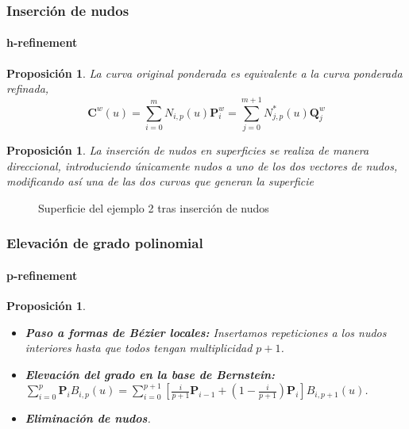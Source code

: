 \documentclass[compress]{beamer}
\newtheorem{proposition}[theorem]{Proposición}
\begin{document}
\begin{frame}
	\frametitle{Inserción de nudos}
	\framesubtitle{h-refinement}

	\scriptsize
	\begin{proposition}
		La curva original ponderada es equivalente a la curva ponderada refinada,
		\vspace{-0.35cm}
		\begin{equation*}
			\mathbf{C}^{w}(u) = \sum_{i=0}^{m} N_{i,p}(u) \mathbf{P}_{i}^{w}=  \sum_{j=0}^{m+1} N_{j,p}^*(u) \mathbf{Q}_{j}^{w} 
		\end{equation*}
	\end{proposition}
	\begin{proposition}
		La inserción de nudos en superficies se realiza de manera direccional, introduciendo únicamente nudos a uno de los dos vectores de nudos,
		modificando así una de las dos curvas que generan la superficie
	\end{proposition}
	\begin{figure}[H]
		\centering
		\tiny
		\captionsetup{font=scriptsize, skip=0pt} 
		
		
		
		
		\caption{Superficie del ejemplo 2 tras inserción de nudos}
		\label{fig:NURBS_surf_3}
	\end{figure}
\end{frame}

\begin{frame}
	\frametitle{Elevación de grado polinomial}
	\framesubtitle{p-refinement}
	\scriptsize
	\begin{proposition}
        \begin{itemize}
			\item \textbf{Paso a formas de Bézier locales:} Insertamos repeticiones a los nudos interiores hasta que todos tengan multiplicidad $p+1$.
			\item \textbf{Elevación del grado en la base de Bernstein:} $\sum_{i=0}^p \mathbf{P}_i B_{i,p}(u) = \sum_{i=0}^{p+1} \left[ \frac{i}{p+1} \mathbf{P}_{i-1} + \left(1 - \frac{i}{p+1}\right) \mathbf{P}_i \right] B_{i, p+1}(u)$.
			\item \textbf{Eliminación de nudos}.
		\end{itemize}
	\end{proposition}
\end{frame}
\end{document}
